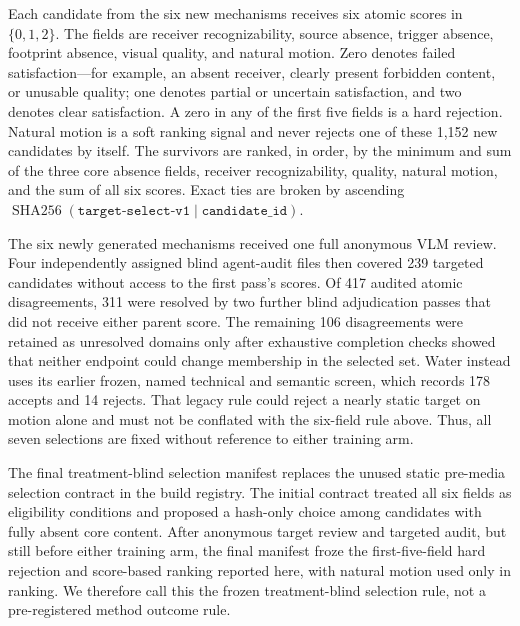 Each candidate from the six new mechanisms receives six atomic scores in
\(\{0,1,2\}\). The fields are receiver recognizability, source absence,
trigger absence, footprint absence, visual quality, and natural motion. Zero
denotes failed satisfaction---for example, an absent receiver, clearly
present forbidden content, or unusable quality; one denotes partial or
uncertain satisfaction, and two denotes clear satisfaction. A zero in any of
the first five fields is a hard rejection. Natural motion is a soft ranking
signal and never rejects one of these 1,152 new candidates by itself. The
survivors are ranked, in order, by the minimum and sum of the three core
absence fields, receiver recognizability, quality, natural motion, and the sum
of all six scores.  Exact ties are broken by ascending
\(
\operatorname{SHA256}(\texttt{target-select-v1}\mathbin{|}\texttt{candidate\_id})
\).

The six newly generated mechanisms received one full anonymous VLM review.
Four independently assigned blind agent-audit files then covered 239 targeted
candidates without access to the first pass's scores. Of 417 audited atomic
disagreements, 311 were resolved by two further blind adjudication passes that
did not receive either parent score.
The remaining 106 disagreements were retained as unresolved domains only
after exhaustive completion checks showed that neither endpoint could change
membership in the selected set. Water instead uses its earlier frozen,
named technical and semantic screen, which records 178 accepts and 14 rejects.
That legacy rule could reject a nearly static target on motion alone and must
not be conflated with the six-field rule above. Thus, all seven selections are
fixed without reference to either training arm.

The final treatment-blind selection manifest replaces the unused static
pre-media selection contract in the build registry. The initial contract
treated all six fields as eligibility conditions and proposed a hash-only
choice among candidates with fully absent core content. After anonymous target
review and targeted audit, but still before either training arm, the final
manifest froze the first-five-field hard rejection and score-based ranking
reported here, with natural motion used only in ranking. We therefore call
this the frozen treatment-blind selection rule, not a pre-registered method
outcome rule.

